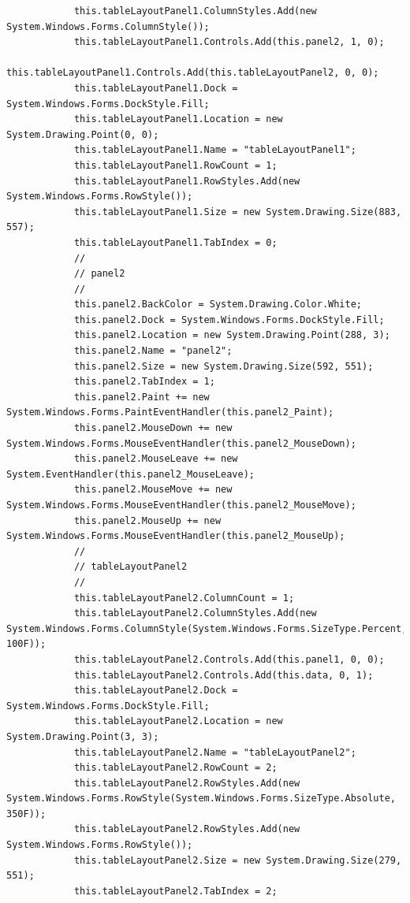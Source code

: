 \documentclass[11pt]{article} %
\begin{document}
\begin{lstlisting}
            this.tableLayoutPanel1.ColumnStyles.Add(new System.Windows.Forms.ColumnStyle());
            this.tableLayoutPanel1.Controls.Add(this.panel2, 1, 0);
            this.tableLayoutPanel1.Controls.Add(this.tableLayoutPanel2, 0, 0);
            this.tableLayoutPanel1.Dock = System.Windows.Forms.DockStyle.Fill;
            this.tableLayoutPanel1.Location = new System.Drawing.Point(0, 0);
            this.tableLayoutPanel1.Name = "tableLayoutPanel1";
            this.tableLayoutPanel1.RowCount = 1;
            this.tableLayoutPanel1.RowStyles.Add(new System.Windows.Forms.RowStyle());
            this.tableLayoutPanel1.Size = new System.Drawing.Size(883, 557);
            this.tableLayoutPanel1.TabIndex = 0;
            // 
            // panel2
            // 
            this.panel2.BackColor = System.Drawing.Color.White;
            this.panel2.Dock = System.Windows.Forms.DockStyle.Fill;
            this.panel2.Location = new System.Drawing.Point(288, 3);
            this.panel2.Name = "panel2";
            this.panel2.Size = new System.Drawing.Size(592, 551);
            this.panel2.TabIndex = 1;
            this.panel2.Paint += new System.Windows.Forms.PaintEventHandler(this.panel2_Paint);
            this.panel2.MouseDown += new System.Windows.Forms.MouseEventHandler(this.panel2_MouseDown);
            this.panel2.MouseLeave += new System.EventHandler(this.panel2_MouseLeave);
            this.panel2.MouseMove += new System.Windows.Forms.MouseEventHandler(this.panel2_MouseMove);
            this.panel2.MouseUp += new System.Windows.Forms.MouseEventHandler(this.panel2_MouseUp);
            // 
            // tableLayoutPanel2
            // 
            this.tableLayoutPanel2.ColumnCount = 1;
            this.tableLayoutPanel2.ColumnStyles.Add(new System.Windows.Forms.ColumnStyle(System.Windows.Forms.SizeType.Percent, 100F));
            this.tableLayoutPanel2.Controls.Add(this.panel1, 0, 0);
            this.tableLayoutPanel2.Controls.Add(this.data, 0, 1);
            this.tableLayoutPanel2.Dock = System.Windows.Forms.DockStyle.Fill;
            this.tableLayoutPanel2.Location = new System.Drawing.Point(3, 3);
            this.tableLayoutPanel2.Name = "tableLayoutPanel2";
            this.tableLayoutPanel2.RowCount = 2;
            this.tableLayoutPanel2.RowStyles.Add(new System.Windows.Forms.RowStyle(System.Windows.Forms.SizeType.Absolute, 350F));
            this.tableLayoutPanel2.RowStyles.Add(new System.Windows.Forms.RowStyle());
            this.tableLayoutPanel2.Size = new System.Drawing.Size(279, 551);
            this.tableLayoutPanel2.TabIndex = 2;

\end{lstlisting}
\end{document}
